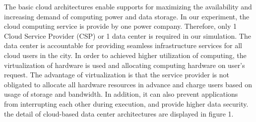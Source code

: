 \documentclass[12pt]{article}
\begin{document}
The basic cloud architectures enable supports for maximizing the availability and increasing demand of computing power and data storage\cite{ok2}. In our experiment, the cloud computing service is provide by one power company. Therefore, only 1 Cloud Service Provider (CSP) or 1 data center is required in our simulation. The data center is accountable for providing seamless infrastructure services for all cloud users in the city. In order to achieved higher utilization of computing, the virtualization of hardware is used and allocating computing hardware on user's request. The advantage of virtualization is that the service provider is not obligated to allocate all  hardware resources in advance and charge users based on usage of storage and bandwidth. In addition, it can also prevent applications from interrupting each other during execution, and provide higher data security. the detail of cloud-based data center architectures are displayed in figure 1.
\newpage


\end{document}
